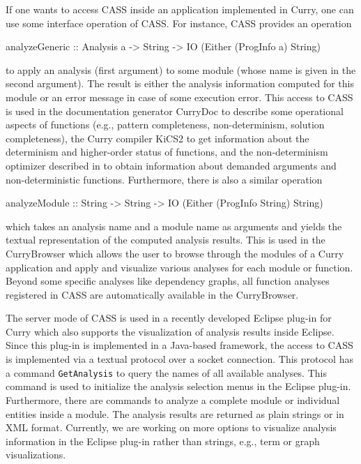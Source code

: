 \documentclass{llncs}
\newcommand{\code}[1]{\mbox{\small\texttt{#1}}}
\begin{document}
If one wants to access CASS inside an application implemented in
Curry, one can use some interface operation of CASS.
For instance, CASS provides an operation
\begin{curry}
analyzeGeneric :: Analysis a -> String
              -> IO (Either (ProgInfo a) String)
\end{curry}
to apply an analysis (first argument) to some module (whose name
is given in the second argument).
The result is either the analysis information computed for this module
or an error message in case of some execution error.
This access to CASS is used in the documentation generator CurryDoc
\cite{Hanus02WFLP} to describe some operational aspects of functions
(e.g., pattern completeness, non-determinism, solution completeness),
the Curry compiler KiCS2 \cite{BrasselHanusPeemoellerReck11}
to get information about the determinism and higher-order status of
functions, and the non-determinism optimizer described in \cite{Hanus12ICLP}
to obtain information about demanded arguments and non-deterministic
functions. Furthermore, there is also a similar operation
\begin{curry}
analyzeModule :: String -> String
              -> IO (Either (ProgInfo String) String)
\end{curry}
which takes an analysis name and a module name as arguments and
yields the textual representation of the computed analysis results.
This is used in the CurryBrowser \cite{Hanus06WLPE}
which allows the user to browse through the modules of
a Curry application and apply and visualize various analyses
for each module or function. Beyond some specific analyses
like dependency graphs, all function analyses registered in CASS
are automatically available in the CurryBrowser.

The server mode of CASS is used in a recently developed
Eclipse plug-in for Curry \cite{Palkus12} which also supports
the visualization of analysis results inside Eclipse.
Since this plug-in is implemented in a Java-based framework,
the access to CASS is implemented via a textual protocol
over a socket connection.
This protocol has a command \code{GetAnalysis} to query
the names of all available analyses.
This command is used to initialize the
analysis selection menus in the Eclipse plug-in.
Furthermore, there are commands to analyze a complete module
or individual entities inside a module.
The analysis results are returned as plain strings or in
XML format.
Currently, we are working on more options to visualize
analysis information in the Eclipse plug-in rather than strings,
e.g., term or graph visualizations.
\end{document}
